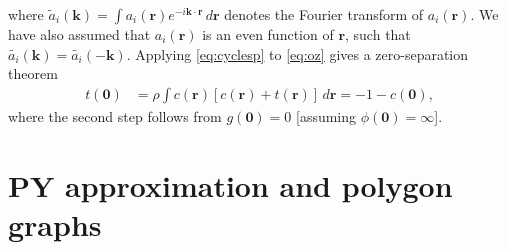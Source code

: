 \documentclass[notitlepage,preprint]{revtex4-1}
\newcommand{\vct}[1]{\mathbf{#1}}
\providecommand{\vr}{} %
\renewcommand{\vr}{\vct{r}}
\newcommand{\vk}{\vct{k}}
\begin{document}
%
where
  $\tilde{a}_i(\vk) = \int a_i(\vr) e^{-i \vk \cdot \vr} \, d\vr$
  denotes the Fourier transform of $a_i(\vr)$.
%
We have also assumed that
  $a_i(\vr)$ is an even function of $\vr$,
  such that
  $\tilde{a_i}(\vk) = \tilde{a_i}(-\vk)$.
%
Applying \eqref{eq:cyclesp} to \eqref{eq:oz} gives
  a zero-separation theorem\cite{rosenfeld1978}
%
\begin{align}
  t(\vct{0})
  &= \rho \int c(\vr) [c(\vr) + t(\vr)] \, d\vr
  = -1 - c(\vct{0}),
\label{eq:zerosep}
\end{align}
%
where the second step follows from
  $g(\vct{0}) = 0$ [assuming $\phi(\vct{0}) = \infty$].





\section{\label{sec:py}PY approximation and polygon graphs}
\end{document}
